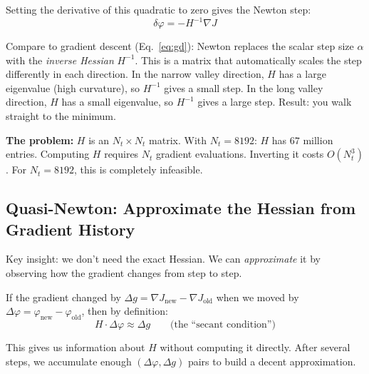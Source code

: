 \documentclass[12pt,a4paper]{article}
\begin{document}
Setting the derivative of this quadratic to zero gives the Newton step:
\begin{equation}
\delta\varphi = -H^{-1}\nabla J
\label{eq:newton}
\end{equation}

\begin{intuition}
Compare to gradient descent (Eq.~\ref{eq:gd}): Newton replaces the scalar step size $\alpha$ with the \emph{inverse Hessian} $H^{-1}$. This is a matrix that automatically scales the step differently in each direction. In the narrow valley direction, $H$ has a large eigenvalue (high curvature), so $H^{-1}$ gives a small step. In the long valley direction, $H$ has a small eigenvalue, so $H^{-1}$ gives a large step. Result: you walk straight to the minimum.
\end{intuition}

\textbf{The problem:} $H$ is an $N_t \times N_t$ matrix. With $N_t = 8192$: $H$ has $67$ million entries. Computing $H$ requires $N_t$ gradient evaluations. Inverting it costs $O(N_t^3)$. For $N_t = 8192$, this is completely infeasible.

\subsection{Quasi-Newton: Approximate the Hessian from Gradient History}

Key insight: we don't need the exact Hessian. We can \emph{approximate} it by observing how the gradient changes from step to step.

If the gradient changed by $\Delta g = \nabla J_{\text{new}} - \nabla J_{\text{old}}$ when we moved by $\Delta\varphi = \varphi_{\text{new}} - \varphi_{\text{old}}$, then by definition:
\begin{equation}
H\cdot\Delta\varphi \approx \Delta g \qquad\text{(the ``secant condition'')}
\end{equation}

This gives us information about $H$ without computing it directly. After several steps, we accumulate enough $(\Delta\varphi, \Delta g)$ pairs to build a decent approximation.
\end{document}
